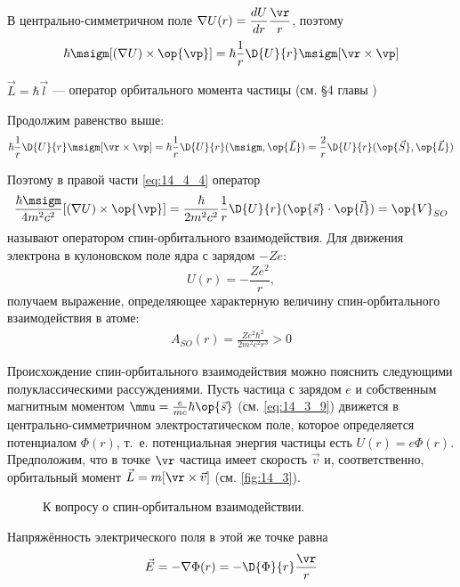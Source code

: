 В центрально-симметричном поле $\nabla U(r) = \dfrac{dU}{dr} \dfrac{\vr}{r}$, поэтому 
$$
\hbar \msigm [(\nabla U) \times \op{\vp}] = \hbar \frac{1}{r} \D{U}{r} \msigm [\vr \times \vp] 
$$

$\vec{L} = \hbar \vec{l}$ --- оператор орбитального момента частицы (см. \S 4 главы )

Продолжим равенство выше:
$$
\hbar \frac{1}{r} \D{U}{r} \msigm [\vr \times \vp] = {\hbar} \frac{1}{r} \D{U}{r} (\msigm, \op{\vec{L}}) = \frac{2}{r} \D{U}{r} (\op{\vec{S}}, \op{\vec{L}})
$$

Поэтому в правой части \eqref{eq:14_4_4} оператор 
$$
\frac{\hbar \msigm}{4m^2c^2} [(\nabla U) \times \op{\vp}] = \frac{\hbar}{2m^2c^2}\frac{1}{r} \D{U}{r} (\op{\vec{s}} \cdot \op{\vec{l}}) = \op{V}_{SO}
$$
называют оператором спин-орбитального взаимодействия. Для движения электрона в кулоновском поле ядра с зарядом $-Ze$:
$$
U(r) = -\frac{Ze^2}{r},
$$
получаем выражение, определяющее характерную величину спин-орбитального взаимодействия в атоме:
\begin{gather*}
\boxed{A_{SO} (r) = \frac{Ze^2 \hbar^2}{2m^2 c^2 r^3} > 0}
\end{gather*}

Происхождение спин-орбитального взаимодействия можно пояснить следующими полуклассическими рассуждениями. Пусть частица с зарядом $e$ и собственным магнитным моментом $\mmu = \frac{e}{mc}\hbar \op{\vec{s}}$ (см. \eqref{eq:14_3_9}) движется в центрально-симметричном электростатическом поле, которое определяется потенциалом $\Phi(r)$, т.~е. потенциальная энергия частицы есть $U(r)=e\Phi(r)$. Предположим, что в точке $\vr$ частица имеет скорость $\vec{v}$ и, соответственно, орбитальный момент $\vec{L} = m[\vr \times \vec{v}]$ (см. \autoref{fig:14_3}).

\begin{figure}[h!]
\centering
{}
\caption{К вопросу о спин-орбитальном взаимодействии.} \label{fig:14_3}
\end{figure}

Напряжённость электрического поля в этой же точке равна
$$
\vec{E} = - \nabla \Phi(r) = -\D{\Phi}{r} \frac{\vr}{r}
$$

